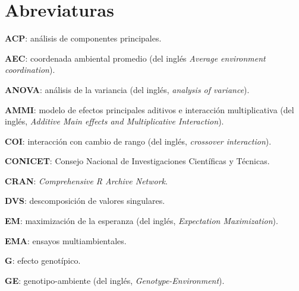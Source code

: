 

\chapter*{Abreviaturas}
\begin{description}
\item{\textbf{ACP}}: análisis de componentes principales.

\item{\textbf{AEC}}: coordenada ambiental promedio (del inglés \emph{Average environment coordination}).

\item{\textbf{ANOVA}}: análisis de la variancia (del inglés, \emph{analysis of variance}).

\item{\textbf{AMMI}}: modelo de efectos principales aditivos e interacción multiplicativa (del inglés, \emph{Additive Main effects and Multiplicative Interaction}).

\item{\textbf{COI}}: interacción con cambio de rango (del inglés, \emph{crossover interaction}).

\item{\textbf{CONICET}}: Consejo Nacional de Investigaciones Científicas y Técnicas.

\item{\textbf{CRAN}}: \emph{Comprehensive R Archive Network}.

\item{\textbf{DVS}}: descomposición de valores singulares.

\item{\textbf{EM}}: maximización de la esperanza (del inglés, \emph{Expectation Maximization}).

\item{\textbf{EMA}}: ensayos multiambientales.

\item{\textbf{G}}: efecto genotípico.

\item{\textbf{GE}}: genotipo-ambiente (del inglés, \emph{Genotype-Environment}).


\end{description}
